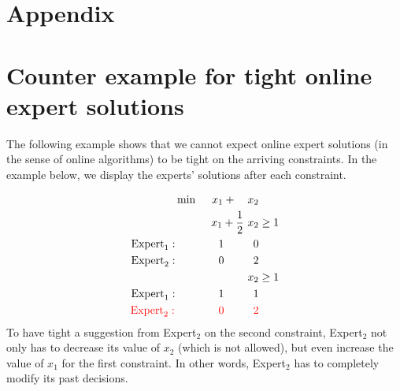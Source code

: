 
\section*{Appendix}
\section{Counter example for tight online expert solutions} \label{appix-tight-solutions}

The following example shows that we cannot expect online expert solutions (in the sense of online algorithms)
to be tight on the arriving constraints. In the example below, we display the experts' solutions after each constraint.

\begin{align*}
    \min\ \ \ \ x_{1} + \ \ \ x_{2} & \\
    x_{1} + \frac{1}{2}\ x_{2} & \ge 1 \\
    \textnormal{Expert}_{1}: \ \ \ \ \ \ \ \ \ \ \ 1 \ \ \ \ \ \ \ \ 0 & \\
    \textnormal{Expert}_{2}: \ \ \ \ \ \ \ \ \ \ \ 0 \ \ \ \ \ \ \ \ 2 & \\
    x_{2} & \ge 1 \\
    \textnormal{Expert}_{1}: \ \ \ \ \ \ \ \ \ \ \ 1 \ \ \ \ \ \ \ \ 1 & \\
    {\color{red}\textnormal{Expert}_{2}:} \ \ \ \ \ \ \ \ \ \ \ \ {\color{red} 0} \ \ \ \ \ \ \ \ {\color{red} 2} & \\
\end{align*}
%
To have tight a suggestion from Expert$_2$ on the second constraint, Expert$_2$ not only has to decrease its value of $x_{2}$ (which is not allowed), but even increase the value of $x_{1}$ for the first constraint. In other words, Expert$_2$ has to completely modify its past decisions.
